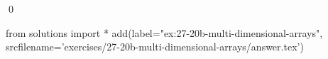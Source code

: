 
\begin{ex} 
  \label{ex:27-20b-multi-dimensional-arrays}
  
  \qed
\end{ex} 
\begin{python0}
from solutions import *
add(label="ex:27-20b-multi-dimensional-arrays",
    srcfilename='exercises/27-20b-multi-dimensional-arrays/answer.tex') 
\end{python0}
